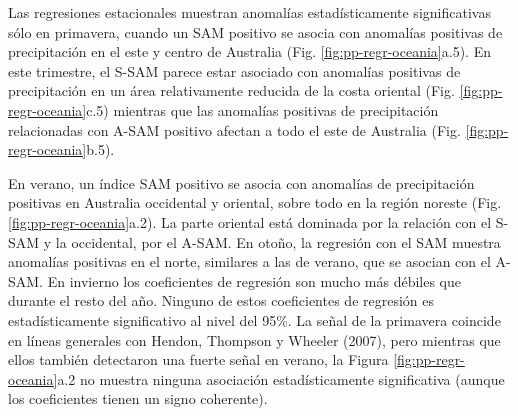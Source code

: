 \documentclass[12pt,oneside,a4paper]{reedthesis}
\begin{document}
Las regresiones estacionales muestran anomalías estadísticamente significativas sólo en primavera, cuando un SAM positivo se asocia con anomalías positivas de precipitación en el este y centro de Australia (Fig. \ref{fig:pp-regr-oceania}a.5).
En este trimestre, el S-SAM parece estar asociado con anomalías positivas de precipitación en un área relativamente reducida de la costa oriental (Fig. \ref{fig:pp-regr-oceania}c.5) mientras que las anomalías positivas de precipitación relacionadas con A-SAM positivo afectan a todo el este de Australia (Fig. \ref{fig:pp-regr-oceania}b.5).

En verano, un índice SAM positivo se asocia con anomalías de precipitación positivas en Australia occidental y oriental, sobre todo en la región noreste (Fig. \ref{fig:pp-regr-oceania}a.2).
La parte oriental está dominada por la relación con el S-SAM y la occidental, por el A-SAM.
En otoño, la regresión con el SAM muestra anomalías positivas en el norte, similares a las de verano, que se asocian con el A-SAM.
En invierno los coeficientes de regresión son mucho más débiles que durante el resto del año.
Ninguno de estos coeficientes de regresión es estadísticamente significativo al nivel del 95\%.
La señal de la primavera coincide en líneas generales con Hendon, Thompson y Wheeler (2007), pero mientras que ellos también detectaron una fuerte señal en verano, la Figura \ref{fig:pp-regr-oceania}a.2 no muestra ninguna asociación estadísticamente significativa (aunque los coeficientes tienen un signo coherente).
\end{document}
